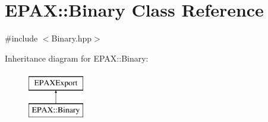 \hypertarget{class_e_p_a_x_1_1_binary}{\section{\-E\-P\-A\-X\-:\-:\-Binary \-Class \-Reference}
\label{class_e_p_a_x_1_1_binary}
}


{\ttfamily \#include $<$\-Binary.\-hpp$>$}

\-Inheritance diagram for \-E\-P\-A\-X\-:\-:\-Binary\-:\begin{figure}[H]
\begin{center}
\leavevmode
\includegraphics[height=2.000000cm]{class_e_p_a_x_1_1_binary}
\end{center}
\end{figure}
